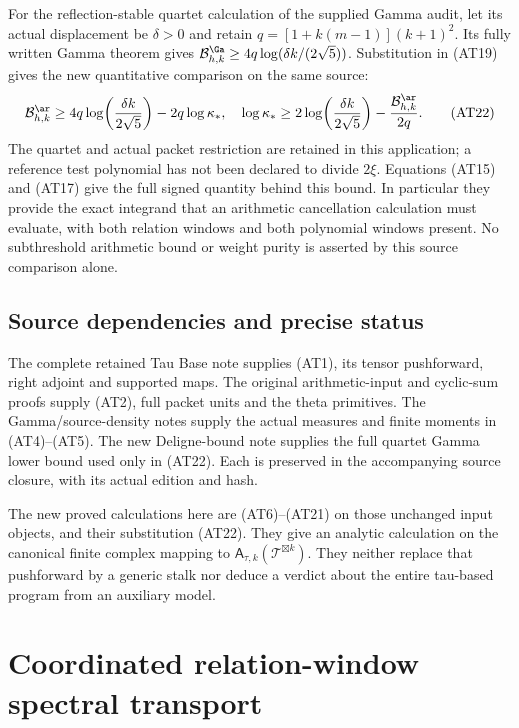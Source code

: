 \documentclass[10pt,a4paper,oneside]{report}
\begin{document}
For the reflection-stable quartet calculation of the supplied
Gamma audit, let its actual displacement be $\delta>0$ and
retain $q=[1+k(m-1)](k+1)^2$. Its fully written Gamma theorem
gives $\mathcal B^\Ga_{h,k}\ge
4q\log(\delta k/(2\sqrt5))$. Substitution in (AT19) gives the
new quantitative comparison on the same source:
\[
 \mathcal B^\ar_{h,k}\ge
 4q\log\!\left(\frac{\delta k}{2\sqrt5}\right)-2q\log\kappa_*,
 \quad
 \log\kappa_*\ge
 2\log\!\left(\frac{\delta k}{2\sqrt5}\right)
       -\frac{\mathcal B^\ar_{h,k}}{2q}.                   \tag{AT22}
\]
The quartet and actual packet restriction are retained in this
application; a reference test polynomial has not been declared
to divide $2\xi$. Equations (AT15) and (AT17) give the full
signed quantity behind this bound. In particular they provide
the exact integrand that an arithmetic cancellation calculation
must evaluate, with both relation windows and both polynomial
windows present. No subthreshold arithmetic bound or weight
purity is asserted by this source comparison alone.

\section{Source dependencies and precise status}

The complete retained Tau Base note supplies (AT1), its tensor
pushforward, right adjoint and supported maps. The original
arithmetic-input and cyclic-sum proofs supply (AT2), full packet
units and the theta primitives. The Gamma/source-density notes
supply the actual measures and finite moments in (AT4)--(AT5).
The new Deligne-bound note supplies the full quartet Gamma
lower bound used only in (AT22). Each is preserved in the
accompanying source closure, with its actual edition and hash.

The new proved calculations here are (AT6)--(AT21) on those
unchanged input objects, and their substitution (AT22). They
give an analytic calculation on the canonical finite complex
mapping to $\mathsf A_{\tau,k}(\mathcal T^{\boxtimes k})$.
They neither replace that pushforward by a generic stalk nor
deduce a verdict about the entire tau-based program from an
auxiliary model.


\endgroup
\clearpage
\chapter{Coordinated relation-window spectral transport}
\begingroup
\newcommand{\C}{\mathbb C}
\newcommand{\Tr}{\operatorname{Tr}}
\newcommand{\cP}{\mathcal P}
\end{document}
